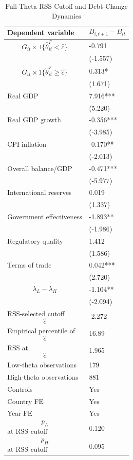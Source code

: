 \begin{table}[H]\centering
\begin{threeparttable}
\caption{Full-Theta RSS Cutoff and Debt-Change Dynamics}
\label{tab:deltaB_rss_cutoff_fulltheta}
\scriptsize
\begin{tabularx}{\textwidth}{lY}
\toprule
Dependent variable & $$B_{i,t+1}-B_{it}$$ \\
\midrule
$$G_{it}\times 1\{\widehat{\theta}^{F}_{it}<\widehat{c}\}$$ & -0.791 \\
 & (-1.557) \\
$$G_{it}\times 1\{\widehat{\theta}^{F}_{it}\geq\widehat{c}\}$$ & 0.313* \\
 & (1.671) \\
Real GDP & 7.916*** \\
 & (5.220) \\
Real GDP growth & -0.356*** \\
 & (-3.985) \\
CPI inflation & -0.170** \\
 & (-2.013) \\
Overall balance/GDP & -0.471*** \\
 & (-5.977) \\
International reserves & 0.019 \\
 & (1.337) \\
Government effectiveness & -1.893** \\
 & (-1.986) \\
Regulatory quality & 1.412 \\
 & (1.586) \\
Terms of trade & 0.042*** \\
 & (2.720) \\
$$\lambda_L-\lambda_H$$ & -1.104** \\
 & (-2.094) \\
\midrule
RSS-selected cutoff $$\widehat{c}$$ & -2.272 \\
Empirical percentile of $$\widehat{c}$$ & 16.89 \\
RSS at $$\widehat{c}$$ & 1.965 \\
Low-theta observations & 179 \\
High-theta observations & 881 \\
Controls & Yes \\
Country FE & Yes \\
Year FE & Yes \\
$$p_L$$ at RSS cutoff & 0.120 \\
$$p_H$$ at RSS cutoff & 0.095 \\

\end{tabularx}
\end{threeparttable}
\end{table}
